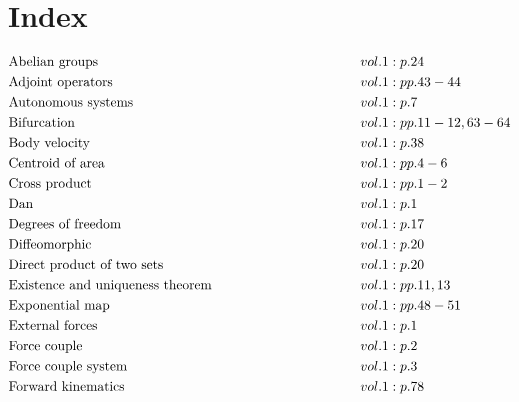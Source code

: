 \documentclass[a4paper]{article}
\begin{document}
 
\section*{Index} 
\allowdisplaybreaks 
\begin{align*} 
&\text{Abelian groups} \hspace*{10em}&& vol. 1: p. 24\\
&\text{Adjoint operators} \hspace*{10em}&& vol. 1: pp. 43-44\\
&\text{Autonomous systems} \hspace*{10em}&& vol. 1: p. 7\\
&\text{Bifurcation} \hspace*{10em}&& vol. 1: pp. 11-12, 63-64\\
&\text{Body velocity} \hspace*{10em}&& vol. 1: p. 38\\
&\text{Centroid of area} \hspace*{10em}&& vol. 1: pp. 4-6\\
&\text{Cross product} \hspace*{10em}&& vol. 1: pp. 1-2\\
&\text{Dan} \hspace*{10em}&& vol. 1: p. 1\\
&\text{Degrees of freedom} \hspace*{10em}&& vol. 1: p. 17\\
&\text{Diffeomorphic} \hspace*{10em}&& vol. 1: p. 20\\
&\text{Direct product of two sets} \hspace*{10em}&& vol. 1: p. 20\\
&\text{Existence and uniqueness theorem} \hspace*{10em}&& vol. 1: pp. 11, 13\\
&\text{Exponential map} \hspace*{10em}&& vol. 1: pp. 48-51\\
&\text{External forces} \hspace*{10em}&& vol. 1: p. 1\\
&\text{Force couple} \hspace*{10em}&& vol. 1: p. 2\\
&\text{Force couple system} \hspace*{10em}&& vol. 1: p. 3\\
&\text{Forward kinematics} \hspace*{10em}&& vol. 1: p. 78\\

\end{align*}
\end{document}
